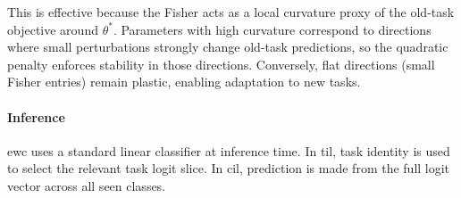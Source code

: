 This is effective because the Fisher acts as a local curvature proxy of the old-task objective around $\theta^*$. Parameters with high curvature correspond to directions where small perturbations strongly change old-task predictions, so the quadratic penalty enforces stability in those directions. Conversely, flat directions (small Fisher entries) remain plastic, enabling adaptation to new tasks. 


\paragraph{Inference}
\gls{ewc} uses a standard linear classifier at inference time. In \gls{til}, task identity is used to select the relevant task logit slice. In \gls{cil}, prediction is made from the full logit vector across all seen classes.